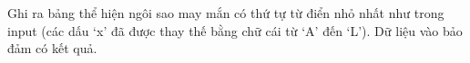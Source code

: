 Ghi ra bảng thể hiện ngôi sao may mắn có thứ tự từ điển nhỏ nhất như trong input (các dấu ‘x’ đã được thay thế bằng chữ cái từ ‘A’ đến ‘L’). Dữ liệu vào bảo đảm có kết quả.